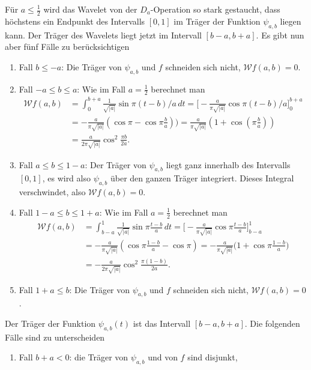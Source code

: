 \begin{loesung}
\begin{teilaufgaben}
%
\item
Für $a\le\frac12$ wird das Wavelet von der $D_a$-Operation so stark gestaucht,
dass höchstens ein Endpunkt des Intervalls $[0,1]$ im Träger der Funktion
$\psi_{a,b}$ liegen kann.
Der Träger des Wavelets liegt jetzt im Intervall $[b-a,b+a]$.
Es gibt nun aber fünf Fälle zu berücksichtigen
\begin{enumerate}
\item Fall $b\le -a$:
Die Träger von $\psi_{a,b}$ und $f$ schneiden
sich nicht, $\mathcal{W}f(a,b)=0$.
\item Fall $-a\le b \le a$:
Wie im Fall $a=\frac12$ berechnet man
\begin{align*}
\mathcal{W}f(a,b)
&=
\int_{0}^{b+a} \frac{1}{\sqrt{|a|}} \sin \pi(t-b)/a\,dt
=
\biggl[
-
\frac{a}{\pi\sqrt{|a|}}
\cos \pi(t-b)/a
\biggr]_0^{b+a}
\\
&=
-\frac{a}{\pi\sqrt{|a|}}(\cos\pi - \cos\pi \frac{b}{a}))
=
\frac{a}{\pi\sqrt{|a|}}(1+\cos(\pi \frac{b}{a}))
\\
&=
\frac{a}{2\pi\sqrt{|a|}}\cos^2\frac{\pi b}{2a}.
\end{align*}
\item Fall $a\le b \le 1-a$:
Der Träger von $\psi_{a,b}$ liegt ganz innerhalb des Intervalls $[0,1]$,
es wird also $\psi_{a,b}$ über den ganzen Träger integriert.
Dieses Integral verschwindet, also 
$\mathcal{W}f(a,b)=0$.
\item Fall $1-a\le b \le 1 +a$:
Wie im Fall $a=\frac12$ berechnet man
\begin{align*}
\mathcal{W}f(a,b)
&=
\int_{b-a}^{1} \frac{1}{\sqrt{|a|}} \sin \pi\frac{t-b}{a}\,dt
=
\biggl[
-
\frac{a}{\pi\sqrt{|a|}}
\cos \pi\frac{t-b}{a}
\biggr]_{b-a}^1
\\
&=
-\frac{a}{\pi\sqrt{|a|}}(
\cos\pi \frac{1-b}{a}
-
\cos\pi 
)
=
-\frac{a}{\pi\sqrt{|a|}}\biggl(1+\cos\pi\frac{1- b}{a}\biggr)
\\
&=
-\frac{a}{2\pi\sqrt{|a|}}\cos^2\frac{\pi(1- b)}{2a}.
\end{align*}
\item Fall $1+a\le b$:
Die Träger von $\psi_{a,b}$ und $f$ schneiden
sich nicht, $\mathcal{W}f(a,b)=0$.
\end{enumerate}
%
%
\item
Der Träger der Funktion $\psi_{a,b}(t)$ ist das Intervall $[b-a,b+a]$.
Die folgenden Fälle sind zu unterscheiden
\begin{enumerate}
\item
Fall $b+a < 0$: die Träger von $\psi_{a,b}$ und von $f$ sind disjunkt,

\end{enumerate}
\end{teilaufgaben}
\end{loesung}
